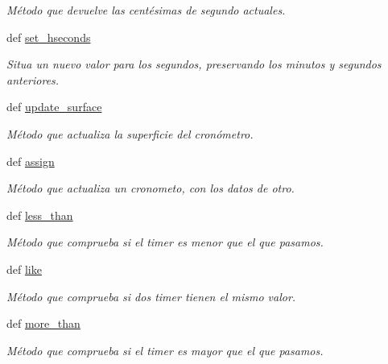 \begin{DoxyCompactItemize}
\begin{DoxyCompactList}\small\item\em \-Método que devuelve las centésimas de segundo actuales. \end{DoxyCompactList}\item 
def \hyperlink{classengine_1_1timer_1_1Timer_a640a75cd2af0d226774469fb80e4b874}{set\-\_\-hseconds}
\begin{DoxyCompactList}\small\item\em \-Situa un nuevo valor para los segundos, preservando los minutos y segundos anteriores. \end{DoxyCompactList}\item 
\hypertarget{classengine_1_1timer_1_1Timer_af5ea96d88bc13b26c7bb8c2adffebc76}{
def \hyperlink{classengine_1_1timer_1_1Timer_af5ea96d88bc13b26c7bb8c2adffebc76}{update\-\_\-surface}}
\label{classengine_1_1timer_1_1Timer_af5ea96d88bc13b26c7bb8c2adffebc76}

\begin{DoxyCompactList}\small\item\em \-Método que actualiza la superficie del cronómetro. \end{DoxyCompactList}\item 
def \hyperlink{classengine_1_1timer_1_1Timer_aeceebe46a3f1372e3bf57eabdc21554a}{assign}
\begin{DoxyCompactList}\small\item\em \-Método que actualiza un cronometo, con los datos de otro. \end{DoxyCompactList}\item 
def \hyperlink{classengine_1_1timer_1_1Timer_a2cb222a07d15d9ffe3370e2c52e4ba8b}{less\-\_\-than}
\begin{DoxyCompactList}\small\item\em \-Método que comprueba si el timer es menor que el que pasamos. \end{DoxyCompactList}\item 
def \hyperlink{classengine_1_1timer_1_1Timer_a547e99eb8d49b5a2461c1e1d90265871}{like}
\begin{DoxyCompactList}\small\item\em \-Método que comprueba si dos timer tienen el mismo valor. \end{DoxyCompactList}\item 
def \hyperlink{classengine_1_1timer_1_1Timer_af336509c93257f4254615a11af49f182}{more\-\_\-than}
\begin{DoxyCompactList}\small\item\em \-Método que comprueba si el timer es mayor que el que pasamos. \end{DoxyCompactList}\end{DoxyCompactItemize}
